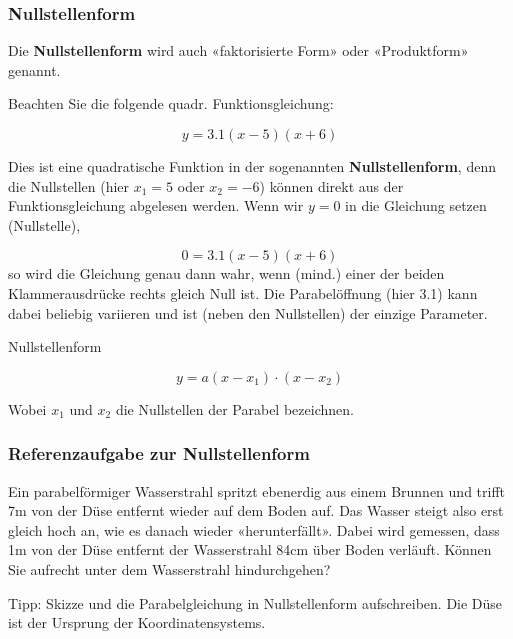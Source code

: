\subsubsection{Nullstellenform}

Die \textbf{Nullstellenform} wird auch  «faktorisierte Form» oder
«Produktform» genannt.

Beachten Sie die folgende quadr. Funktionsgleichung:

$$y = 3.1(x-5)(x+6)$$

Dies ist eine quadratische Funktion in der sogenannten
\textbf{Nullstellenform}, denn die Nullstellen (hier $x_1 = 5$ oder
$x_2 = -6$) können direkt aus der Funktionsgleichung abgelesen werden.
Wenn wir $y=0$ in die Gleichung setzen (Nullstelle),

$$0 = 3.1(x-5)(x+6)$$
so wird die Gleichung genau dann wahr, wenn (mind.) einer der beiden Klammerausdrücke rechts
gleich Null ist. Die Parabelöffnung (hier 3.1) kann dabei beliebig variieren und ist (neben den Nullstellen) der einzige Parameter.



\begin{gesetz}{Nullstellenform}{}

  $$y = a(x-x_1)\cdot{}(x-x_2)$$

  Wobei $x_1$ und $x_2$ die Nullstellen der Parabel bezeichnen. 
  \end{gesetz}

\newpage


\subsubsection*{Referenzaufgabe zur Nullstellenform}


Ein parabelförmiger Wasserstrahl spritzt ebenerdig aus einem Brunnen und trifft 7m von der Düse entfernt wieder auf dem Boden auf.
Das Wasser steigt also erst gleich hoch an, wie es danach wieder «herunterfällt».
Dabei wird gemessen, dass 1m von der Düse entfernt der Wasserstrahl 84cm über Boden verläuft.
Können Sie aufrecht unter dem Wasserstrahl hindurchgehen?

Tipp: Skizze und  die Parabelgleichung in Nullstellenform aufschreiben. Die Düse ist der Ursprung der Koordinatensystems.\\

